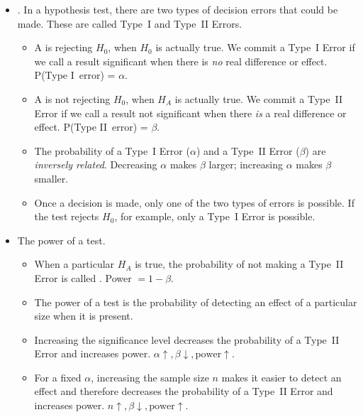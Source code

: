 \begin{itemize}
\item {}.  In a hypothesis test, there are two types of decision errors that could be made.  These are called Type~I and Type~II Errors. \vspace{-1mm}
\begin{itemize}
\item A  is rejecting $H_0$, when $H_0$ is actually true.  We commit a Type~I Error if we call a result significant when there is \emph{no} real difference or effect.  P(Type I~error) = $\alpha$.
\item A  is not rejecting $H_0$, when $H_A$ is actually true.  We commit a Type~II Error if we call a result not significant when there \emph{is} a real difference or effect.  P(Type II~error) = $\beta$.
\item The probability of a Type~I Error ($\alpha$) and a Type~II Error ($\beta$) are \emph{inversely related}. Decreasing $\alpha$ makes $\beta$ larger; increasing $\alpha$ makes $\beta$ smaller.  
\item Once a decision is made, only one of the two types of errors is possible.  If the test rejects $H_0$, for example, only a Type~I Error is possible.
\end{itemize}
\item The power of a test.
\begin{itemize}\vspace{-1mm}
\setlength{\itemsep}{0mm}
\item When a particular $H_A$ is true, the probability of not making a Type~II Error is called .  Power $= 1 - \beta$.  
\item The power of a test is the probability of detecting an effect of a particular size when it is present.
\item Increasing the significance level decreases the probability of a Type~II Error and increases power.  $\alpha \uparrow, \beta \downarrow, \text{power} \uparrow$.  
\item For a fixed $\alpha$, increasing the sample size $n$ makes it easier to detect an effect and therefore decreases the probability of a Type~II Error and increases power.   $n \uparrow, \beta \downarrow, \text{power} \uparrow$.


\end{itemize}
\end{itemize}


{}

